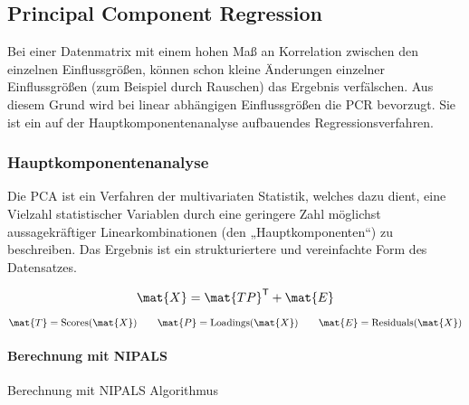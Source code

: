 \subsection{Principal Component Regression}
Bei einer Datenmatrix mit einem hohen Maß an Korrelation zwischen den einzelnen Einflussgrößen, können schon kleine Änderungen einzelner Einflussgrößen (zum Beispiel durch Rauschen) das Ergebnis verfälschen.
Aus diesem Grund wird bei linear abhängigen Einflussgrößen die \gls{PCR} bevorzugt.
Sie ist ein auf der Hauptkomponentenanalyse aufbauendes Regressionsverfahren.

\subsubsection{Hauptkomponentenanalyse}
Die PCA ist ein Verfahren der multivariaten Statistik, welches dazu dient, eine Vielzahl statistischer Variablen durch eine geringere Zahl möglichst aussagekräftiger Linearkombinationen (den „Hauptkomponenten“) zu beschreiben.
Das Ergebnis ist ein strukturiertere und vereinfachte Form des Datensatzes.

\begin{equation}
  \mat{X} = \mat{TP}^\mathsf{T} + \mat{E}
\end{equation}

\begin{equation*}
    \mat{T} = \mathrm{Scores}(\mat{X}) \qquad \mat{P} = \mathrm{Loadings}(\mat{X}) \qquad \mat{E} = \mathrm{Residuals}(\mat{X})
\end{equation*}

\paragraph{Berechnung mit NIPALS}
Berechnung mit NIPALS Algorithmus \cite{kessler_2008}

